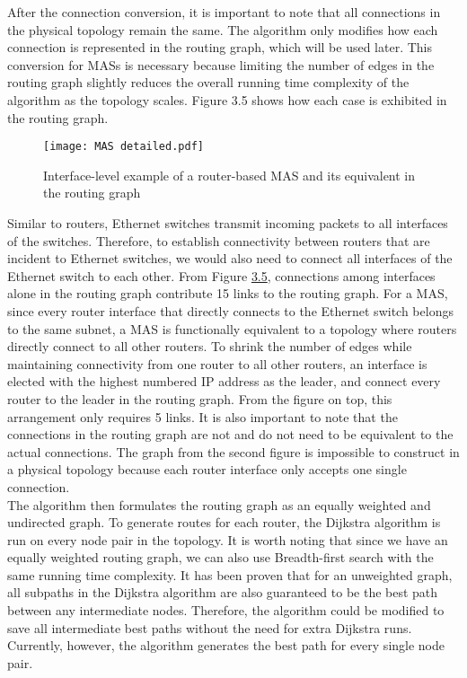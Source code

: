 \documentclass{uiucthesis2021}
\begin{document}
\noindent After the connection conversion, it is important to note that all connections in the physical topology remain the same. The algorithm only modifies how each connection is represented in the routing graph, which will be used later. This conversion for MASs is necessary because limiting the number of edges in the routing graph slightly reduces the overall running time complexity of the algorithm as the topology scales. Figure 3.5 shows how each case is exhibited in the routing graph.\\

\label{f35}
\begin{figure}[H]
\texttt{[image: MAS detailed.pdf]}
\centering
\caption{Interface-level example of a router-based MAS and its equivalent in the routing graph}
\centering
\end{figure}

\noindent Similar to routers, Ethernet switches transmit incoming packets to all interfaces of the switches. Therefore, to establish connectivity between routers that are incident to Ethernet switches, we would also need to connect all interfaces of the Ethernet switch to each other. From Figure \hyperref[f35]{3.5}, connections among interfaces alone in the routing graph contribute 15 links to the routing graph. For a MAS, since every router interface that  directly connects to the Ethernet switch belongs to the same subnet, a MAS is functionally equivalent to a topology where routers directly connect to all other routers. To shrink the number of edges while maintaining connectivity from one router to all other routers, an interface is elected with the highest numbered IP address as the leader, and connect every router to the leader in the routing graph. From the figure on top, this arrangement only requires 5 links. It is also important to note that the connections in the routing graph are not and do not need to be equivalent to the actual connections. The graph from the second figure is impossible to construct in a physical topology because each router interface only accepts one single connection.\\

\noindent The algorithm then formulates the routing graph as an equally weighted and undirected graph. To generate routes for each router, the Dijkstra algorithm is run on every node pair in the topology. It is worth noting that since we have an equally weighted routing graph, we can also use Breadth-first search with the same running time complexity. It has been proven that for an unweighted graph, all subpaths in the Dijkstra algorithm are also guaranteed to be the best path between any intermediate nodes. Therefore, the algorithm could be modified to save all intermediate best paths without the need for extra Dijkstra runs. Currently, however, the algorithm generates the best path for every single node pair.\\
\end{document}
